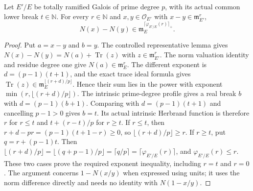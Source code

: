 \begin{lemma}
\label{fw:prime-norm-herbrand-continuity}
\leanok
Let $E'/E$ be totally ramified Galois of prime degree $p$,
with its actual common lower break $t\in\mathbb N$.
For every $r\in\mathbb N$ and $x,y\in\mathcal O_{E'}$ with
$x-y\in\mathfrak m_{E'}^r$,
\[
 N(x)-N(y)\in\mathfrak m_E^{\lceil\varphi_{E'/E}(r)\rceil_+}.
\]
\end{lemma}
\begin{proof}
Put $a=x-y$ and $b=y$. The controlled representative lemma
gives $N(x)-N(y)=N(a)+\operatorname{Tr}(z)$ with
$z\in\mathfrak m_{E'}^r$. The norm valuation identity and
residue degree one give $N(a)\in\mathfrak m_E^r$.
The different exponent is $d=(p-1)(t+1)$, and the exact trace
ideal formula gives
$\operatorname{Tr}(z)\in\mathfrak m_E^{\lfloor(r+d)/p\rfloor}$.
Hence their sum lies in the power with exponent
$\min(r,\lfloor(r+d)/p\rfloor)$.
The intrinsic prime-degree profile gives a real break $b$ with
$d=(p-1)(b+1)$. Comparing with $d=(p-1)(t+1)$ and cancelling
$p-1>0$ gives $b=t$. Its actual intrinsic Herbrand function is
therefore $r$ for $r\leq t$ and $t+(r-t)/p$ for $r\geq t$. If $r\leq t$, then
$r+d-pr=(p-1)(t+1-r)\geq0$, so $\lfloor(r+d)/p\rfloor\geq r$.
If $r\geq t$, put $q=r+(p-1)t$. Then
$\lfloor(r+d)/p\rfloor=\lfloor(q+p-1)/p\rfloor
=\lceil q/p\rceil=\lceil\varphi_{E'/E}(r)\rceil$,
and $\varphi_{E'/E}(r)\leq r$.
These two cases prove the required exponent inequality, including
$r=t$ and $r=0$. The argument concerns $1-N(x/y)$ when expressed
using units; it uses the norm difference directly and needs no
identity with $N(1-x/y)$.
\end{proof}

